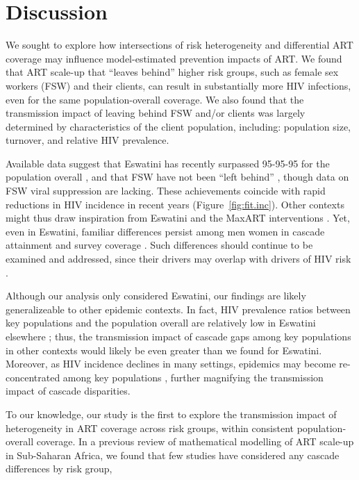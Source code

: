\section{Discussion}\label{disc}
We sought to explore how intersections of risk heterogeneity and differential ART coverage
may influence model-estimated prevention impacts of ART.
We found that ART scale-up that ``leaves behind'' higher risk groups,
such as female sex workers (FSW) and their clients,
can result in substantially more HIV infections,
even for the same population-overall coverage.
We also found that the transmission impact of
leaving behind FSW and/or clients was largely determined by
characteristics of the client population, including:
population size, turnover, and relative HIV prevalence.
\par
Available data suggest that
Eswatini has recently surpassed 95-95-95 for the population overall \cite{SHIMS3},
and that FSW have not been ``left behind'' \cite{EswIBBS2022},
though data on FSW viral suppression are lacking.
These achievements coincide with rapid reductions in HIV incidence in recent years
\cite{SHIMS1,SHIMS2,SHIMS3} (Figure~\ref{fig:fit.inc}).
Other contexts might thus draw inspiration from
Eswatini and the MaxART interventions \cite{Walsh2020}.
Yet, even in Eswatini, familiar differences persist among men \vs women
in cascade attainment and survey coverage \cite{SHIMS1,SHIMS2,SHIMS3}.
Such differences should continue to be examined and addressed,
since their drivers may overlap with drivers of HIV risk \cite{Akullian2017,Camlin2019}.
\par
Although our analysis only considered Eswatini,
our findings are likely generalizeable to other epidemic contexts.
In fact, HIV prevalence ratios between key populations and the population overall
are relatively low in Eswatini \vs elsewhere \cite{Baral2012,Hessou2019};
thus, the transmission impact of cascade gaps among key populations in other contexts
would likely be even greater than we found for Eswatini.
Moreover, as HIV incidence declines in many settings,
epidemics may become re-concentrated among key populations \cite{Brown2019,Garnett2021},
further magnifying the transmission impact of cascade disparities.
\par
To our knowledge, our study is the first to explore the transmission impact of
heterogeneity in ART coverage across risk groups, within consistent population-overall coverage.
In a previous review of mathematical modelling of ART scale-up in Sub-Saharan Africa,
we found that few studies have considered any cascade differences by risk group,
